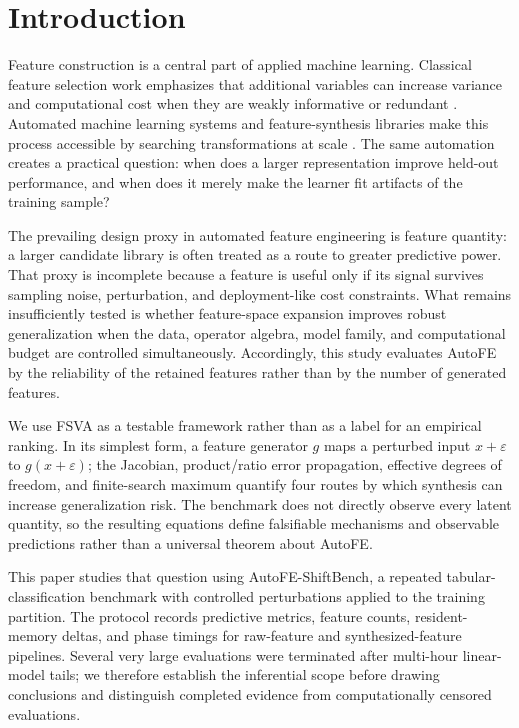 \documentclass[preprint,12pt]{elsarticle}
\begin{document}
\section{Introduction}
\label{sec:introduction}

Feature construction is a central part of applied machine learning.  Classical feature selection work emphasizes that additional variables can increase variance and computational cost when they are weakly informative or redundant \citep{guyon2003}.  Automated machine learning systems and feature-synthesis libraries make this process accessible by searching transformations at scale \citep{feurer2015,olson2019,kanter2015}.  The same automation creates a practical question: when does a larger representation improve held-out performance, and when does it merely make the learner fit artifacts of the training sample?

The prevailing design proxy in automated feature engineering is feature quantity: a larger candidate library is often treated as a route to greater predictive power.  That proxy is incomplete because a feature is useful only if its signal survives sampling noise, perturbation, and deployment-like cost constraints.  What remains insufficiently tested is whether feature-space expansion improves robust generalization when the data, operator algebra, model family, and computational budget are controlled simultaneously.  Accordingly, this study evaluates AutoFE by the reliability of the retained features rather than by the number of generated features.

We use FSVA as a testable framework rather than as a label for an empirical ranking.  In its simplest form, a feature generator $g$ maps a perturbed input $x+\varepsilon$ to $g(x+\varepsilon)$; the Jacobian, product/ratio error propagation, effective degrees of freedom, and finite-search maximum quantify four routes by which synthesis can increase generalization risk.  The benchmark does not directly observe every latent quantity, so the resulting equations define falsifiable mechanisms and observable predictions rather than a universal theorem about AutoFE.

This paper studies that question using AutoFE-ShiftBench, a repeated tabular-classification benchmark with controlled perturbations applied to the training partition.  The protocol records predictive metrics, feature counts, resident-memory deltas, and phase timings for raw-feature and synthesized-feature pipelines.  Several very large evaluations were terminated after multi-hour linear-model tails; we therefore establish the inferential scope before drawing conclusions and distinguish completed evidence from computationally censored evaluations.
\end{document}
